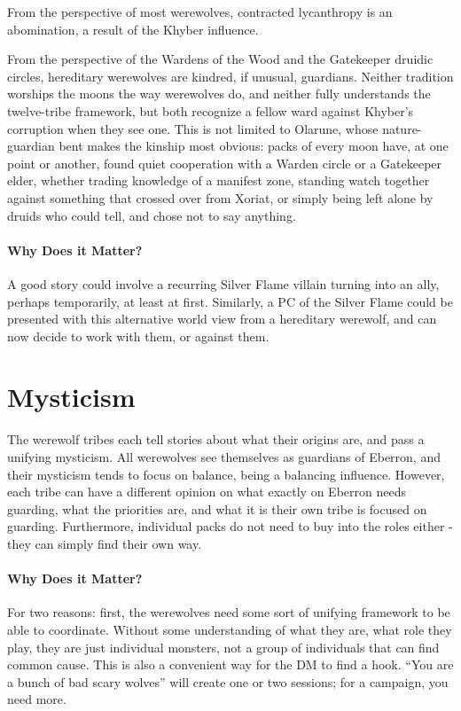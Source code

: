 \documentclass[twocolumn]{dndbook}
\begin{document}
From the perspective of most werewolves, contracted lycanthropy is an abomination, a result of the Khyber influence.\par

From the perspective of the Wardens of the Wood and the Gatekeeper druidic circles, hereditary werewolves are kindred, if unusual, guardians.
Neither tradition worships the moons the way werewolves do, and neither fully understands the twelve-tribe framework, but both recognize a fellow ward against Khyber's corruption when they see one.
This is not limited to Olarune, whose nature-guardian bent makes the kinship most obvious: packs of every moon have, at one point or another, found quiet cooperation with a Warden circle or a Gatekeeper elder, whether trading knowledge of a manifest zone, standing watch together against something that crossed over from Xoriat, or simply being left alone by druids who could tell, and chose not to say anything.\par

\paragraph*{Why Does it Matter?} A good story could involve a recurring Silver Flame villain turning into an ally, perhaps temporarily, at least at first.
Similarly, a PC of the Silver Flame could be presented with this alternative world view from a hereditary werewolf, and can now decide to work with them, or against them.\par

\section*{Mysticism}

The werewolf tribes each tell stories about what their origins are, and pass a unifying mysticism.
All werewolves see themselves as guardians of Eberron,
and their mysticism tends to focus on balance, being a balancing influence.
However, each tribe can have a different opinion on what exactly on Eberron needs guarding, what the priorities are, and what it is their own tribe is focused on guarding.
Furthermore, individual packs do not need to buy into the roles either - they can simply find their own way.\par

\paragraph*{Why Does it Matter?} For two reasons: first, the werewolves need some sort of unifying framework to be able to coordinate.
Without some understanding of what they are, what role they play, they are just individual monsters, not a group of individuals that can find common cause.
This is also a convenient way for the DM to find a hook.
``You are a bunch of bad scary wolves'' will create one or two sessions; for a campaign, you need more.\par
\end{document}
